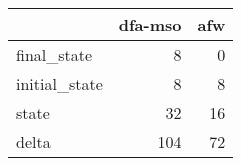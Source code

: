 \begin{tabular}{lrr}
\toprule
{} &  dfa-mso &  afw \\
\midrule
final\_state   &        8 &    0 \\
initial\_state &        8 &    8 \\
state         &       32 &   16 \\
delta         &      104 &   72 \\
\bottomrule
\end{tabular}
